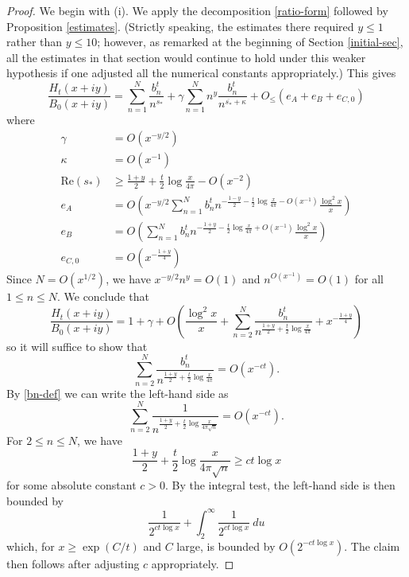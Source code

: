 \begin{proof}  We begin with (i).  We apply the decomposition \eqref{ratio-form} followed by Proposition \ref{estimates}.  (Strictly speaking, the estimates there required $y \leq 1$ rather than $y \leq 10$; however, as remarked at the beginning of Section \ref{initial-sec}, all the estimates in that section would continue to hold under this weaker hypothesis if one adjusted all the numerical constants appropriately.)  This gives
\begin{equation}\label{exp}
\frac{H_t(x+iy)}{B_0(x+iy)} = \sum_{n=1}^N \frac{b_n^t}{n^{s_*}} + \gamma \sum_{n=1}^N n^y \frac{b_n^t}{n^{\overline{s_*} + \kappa}} + O_{\leq}\left( e_A + e_B + e_{C,0} \right)
\end{equation}
where
\begin{align*}
\gamma &= O( x^{-y/2} ) \\
\kappa &= O(x^{-1}) \\
\mathrm{Re}(s_*) &\geq \frac{1+y}{2} + \frac{t}{2} \log \frac{x}{4\pi}  - O(x^{-2}) \\
e_A &= O( x^{-y/2} \sum_{n=1}^N b_n^t n^{-\frac{1-y}{2} - \frac{t}{2} \log \frac{x}{4\pi} - O(x^{-1})} \frac{\log^2 x}{x} ) \\ 
e_B &= O( \sum_{n=1}^N b_n^t n^{-\frac{1+y}{2} - \frac{t}{2} \log \frac{x}{4\pi} + O(x^{-1})} \frac{\log^2 x}{x} ) \\ 
e_{C,0} &= O( x^{-\frac{1+y}{4}} )
\end{align*}
Since $N = O(x^{1/2})$, we have $x^{-y/2} n^{y} = O(1)$ and $n^{O(x^{-1})} = O(1)$ for all $1 \leq n \leq N$.  We conclude that
$$\frac{H_t(x+iy)}{B_0(x+iy)} = 1 + \gamma + O( \frac{\log^2 x}{x} + \sum_{n=2}^N \frac{b_n^t}{n^{\frac{1+y}{2} + \frac{t}{2} \log \frac{x}{4\pi}}} + x^{-\frac{1+y}{4}} ) $$
so it will suffice to show that
$$ \sum_{n=2}^N \frac{b_n^t}{n^{\frac{1+y}{2} + \frac{t}{2} \log \frac{x}{4\pi}}} = O( x^{-ct} ).$$
By \eqref{bn-def} we can write the left-hand side as
$$ \sum_{n=2}^N \frac{1}{n^{\frac{1+y}{2} + \frac{t}{2} \log \frac{x}{4\pi \sqrt{n}}}} = O( x^{-ct} ).$$
For $2 \leq n \leq N$, we have
$$ \frac{1+y}{2} + \frac{t}{2} \log \frac{x}{4\pi \sqrt{n}} \geq c t \log x $$
for some absolute constant $c>0$.  By the integral test, the left-hand side is then bounded by
$$ \frac{1}{2^{c t \log x}} + \int_2^\infty \frac{1}{2^{c t \log x}}\ du$$
which, for $x \geq \exp(C/t)$ and $C$ large, is bounded by $O(2^{-ct\log x})$.  The claim then follows after adjusting $c$ appropriately.



\end{proof}
